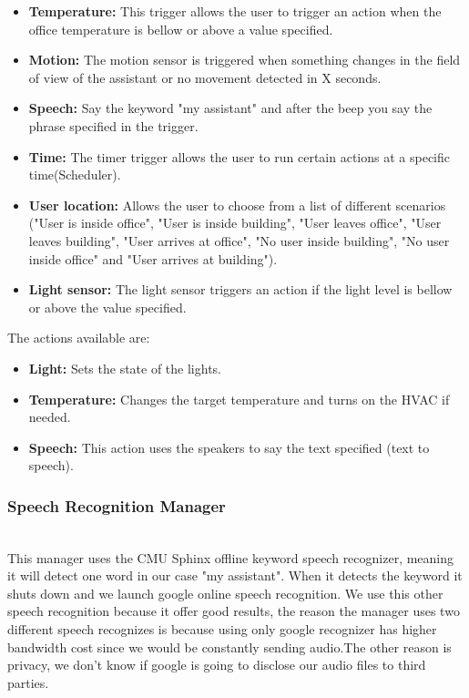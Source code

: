 \begin{itemize}
  \item \textbf{Temperature:} This trigger allows the user to trigger an action when the office temperature is bellow or above a value specified.
  \item \textbf{Motion:} The motion sensor is triggered when something changes in the field of view of the assistant or no movement detected in X seconds.
  \item \textbf{Speech:} Say the keyword "my assistant" and after the beep you say the phrase specified in the trigger.  
  \item \textbf{Time:} The timer trigger allows the user to run certain actions at a specific time(Scheduler).  
  \item \textbf{User location:} Allows the user to choose from a list of different scenarios ("User is inside office", "User is inside building", "User leaves office", "User leaves building", "User arrives at office", "No user inside building", "No user inside office" and "User arrives at building").
  \item \textbf{Light sensor:} The light sensor triggers an action if the light level is bellow or above the value specified.
  
\end{itemize}

The actions available are:

\begin{itemize}
  \item \textbf{Light:} Sets the state of the lights.
  \item \textbf{Temperature:} Changes the target temperature and turns on the HVAC if needed.
  \item \textbf{Speech:} This action uses the speakers to say the text specified (text to speech).
\end{itemize}


\subsubsection{Speech Recognition Manager}\mbox{}\\

This manager uses the CMU Sphinx offline keyword speech recognizer, meaning it will detect one word in our case "my assistant". When it detects the keyword it shuts down and we launch google online speech recognition. We use this other speech recognition because it offer good results, the reason the manager uses two different speech recognizes is because using only google recognizer has higher bandwidth cost since we would be constantly sending audio.The other reason is privacy, we don't know if google is going to disclose our audio files to third parties.

